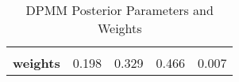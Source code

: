 \begin{table}
\centering
\caption{DPMM Posterior Parameters and Weights}
\centering
\begin{tabular}[t]{|>{}lrrrr}
\toprule
\textbf{\cellcolor{gray!10}{lambdas}} & \cellcolor{gray!10}{11.964} & \cellcolor{gray!10}{3.880} & \cellcolor{gray!10}{2.034} & \cellcolor{gray!10}{0.718}\\
\textbf{weights} & 0.198 & 0.329 & 0.466 & 0.007\\
\bottomrule
\end{tabular}
\end{table}

